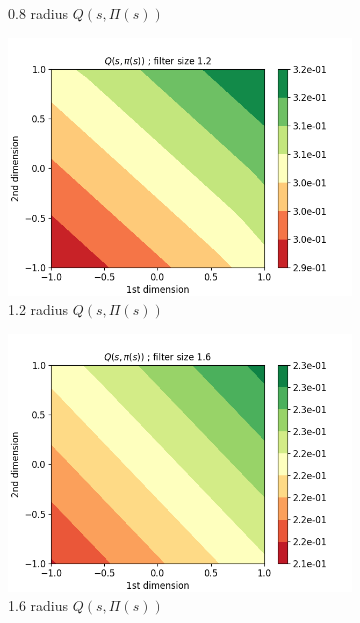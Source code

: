 \documentclass{article}
\begin{document}
\begin{figure}[H]
\begin{subfigure}[b]{0.3\linewidth}
      \caption{0.8 radius $Q(s, \Pi(s))$}
  \end{subfigure}
   \begin{subfigure}[b]{0.3\linewidth}
    \includegraphics[width=\linewidth]{Study_2/2.3/visualizations/Q_contour_1_2.png}
      \caption{1.2 radius $Q(s, \Pi(s))$}
  \end{subfigure}
   \begin{subfigure}[b]{0.3\linewidth}
    \includegraphics[width=\linewidth]{Study_2/2.3/visualizations/Q_contour_1_6.png}
      \caption{1.6 radius $Q(s, \Pi(s))$}
  \end{subfigure}
   \begin{subfigure}[b]{0.3\linewidth}

\end{subfigure}
\end{figure}
\end{document}
